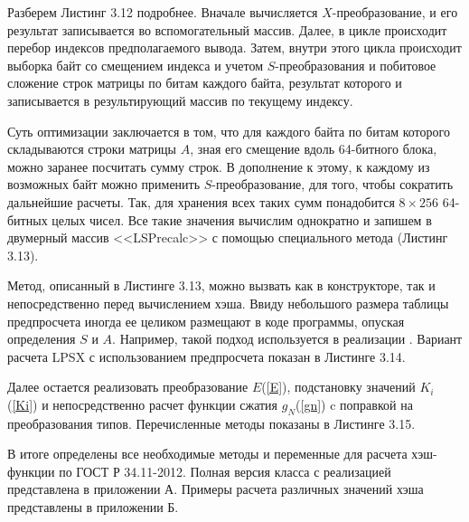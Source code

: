 \par Разберем Листинг 3.12 подробнее. Вначале вычисляется $X$-преобразование, и его результат записывается во вспомогательный массив. Далее, в цикле происходит перебор индексов предполагаемого вывода. Затем, внутри этого цикла происходит выборка байт со смещением индекса и учетом $S$-преобразования и побитовое сложение строк матрицы по битам каждого байта, результат которого и записывается в результирующий массив по текущему индексу.
\par Суть оптимизации заключается в том, что для каждого байта по битам которого складываются строки матрицы $A$, зная его смещение вдоль 64-битного блока, можно заранее посчитать сумму строк.  В дополнение к этому, к каждому из возможных байт можно применить $S$-преобразование, для того, чтобы сократить дальнейшие расчеты. Так, для хранения всех таких сумм понадобится $8\times 256$ 64-битных целых чисел. Все такие значения вычислим однократно и запишем в двумерный массив <<LSPrecalc>> с помощью специального метода (Листинг 3.13).

\par
Метод, описанный в Листинге 3.13, можно вызвать как в конструкторе, так и непосредственно перед вычислением хэша. Ввиду небольшого размера таблицы предпросчета иногда ее целиком размещают в коде программы, опуская определения $S$ и $A$. Например, такой подход используется в реализации \cite{degtyarevHash}. Вариант расчета LPSX с использованием предпросчета показан в Листинге 3.14.

\par
Далее остается реализовать преобразование $E$(\ref{E}), подстановку значений $K_i$(\ref{Ki}) и непосредственно расчет функции сжатия $g_N$(\ref{gn}) c поправкой на преобразования типов. 
Перечисленные методы показаны в Листинге 3.15.

\par
В итоге определены все необходимые методы и переменные для расчета хэш-функции по ГОСТ Р 34.11-2012. Полная версия класса с реализацией представлена в приложении А. Примеры расчета различных значений хэша представлены в приложении Б.